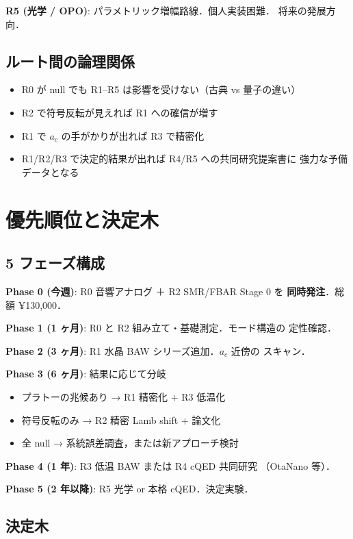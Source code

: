 \documentclass[11pt,a4paper]{article}
\begin{document}
\textbf{R5 (光学 / OPO)}: パラメトリック増幅路線．個人実装困難．
将来の発展方向．

\subsection{ルート間の論理関係}

\begin{itemize}
\item R0 が null でも R1--R5 は影響を受けない（古典 vs 量子の違い）
\item R2 で符号反転が見えれば R1 への確信が増す
\item R1 で $a_c$ の手がかりが出れば R3 で精密化
\item R1/R2/R3 で決定的結果が出れば R4/R5 への共同研究提案書に
強力な予備データとなる
\end{itemize}

\section{優先順位と決定木}

\subsection{5 フェーズ構成}

\textbf{Phase 0 (今週)}: R0 音響アナログ ＋ R2 SMR/FBAR Stage 0 を
\textbf{同時発注}．総額 ¥130,000．

\textbf{Phase 1 (1 ヶ月)}: R0 と R2 組み立て・基礎測定．モード構造の
定性確認．

\textbf{Phase 2 (3 ヶ月)}: R1 水晶 BAW シリーズ追加．$a_c$ 近傍の
スキャン．

\textbf{Phase 3 (6 ヶ月)}: 結果に応じて分岐
\begin{itemize}
\item プラトーの兆候あり → R1 精密化 + R3 低温化
\item 符号反転のみ → R2 精密 Lamb shift + 論文化
\item 全 null → 系統誤差調査，または新アプローチ検討
\end{itemize}

\textbf{Phase 4 (1 年)}: R3 低温 BAW または R4 cQED 共同研究
（OtaNano 等）．

\textbf{Phase 5 (2 年以降)}: R5 光学 or 本格 cQED．決定実験．

\subsection{決定木}
\end{document}
